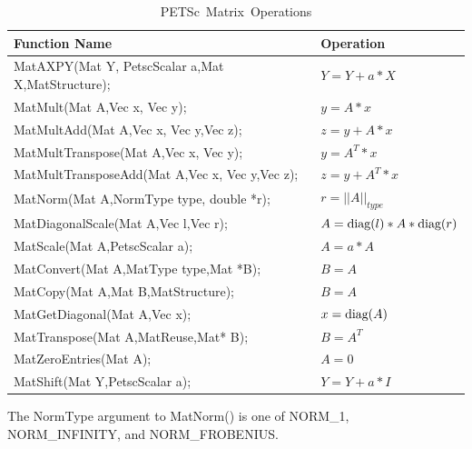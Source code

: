\begin{table}[tb]
\begin{center}
\begin{tabular}{ll}
{\bf Function Name} & {\bf Operation} \\
\hline
MatAXPY(Mat Y, PetscScalar a,Mat X,MatStructure); & $ Y = Y + a*X $ \\
MatMult(Mat A,Vec x, Vec y); & $ y = A*x $ \\
MatMultAdd(Mat A,Vec x, Vec y,Vec z); & $ z = y + A*x $ \\
MatMultTranspose(Mat A,Vec x, Vec y); & $ y = A^{T}*x $ \\
MatMultTransposeAdd(Mat A,Vec x, Vec y,Vec z); & $ z = y + A^{T}*x $ \\
MatNorm(Mat A,NormType type,  double *r); & $ r = ||A||_{type}$ \\
MatDiagonalScale(Mat A,Vec l,Vec r); & $ A = \hbox{diag}(l)*A*\hbox{diag}(r) $ \\
MatScale(Mat A,PetscScalar a); & $ A = a*A $ \\
MatConvert(Mat A,MatType type,Mat *B); & $ B = A $ \\
MatCopy(Mat A,Mat B,MatStructure); &  $ B = A $ \\
MatGetDiagonal(Mat A,Vec x); & $ x = \hbox{diag}(A)$ \\
MatTranspose(Mat A,MatReuse,Mat* B); & $ B = A^{T} $ \\
MatZeroEntries(Mat A); & $ A = 0 $ \\
MatShift(Mat Y,PetscScalar a); & $ Y =  Y + a*I $ \\
\hline
\end{tabular}
\end{center}
\caption{\hbox{PETSc Matrix Operations}}
\label{fig_matrixops}
\end{table}
The NormType argument to MatNorm() is one of
NORM\_1, NORM\_INFINITY, and NORM\_FROBENIUS.

  
